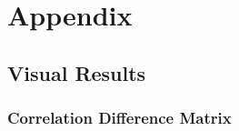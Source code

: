 
\chapter{Appendix} \label{ch:Appendix}


\section*{Visual Results}
\subsection[]{Correlation Difference Matrix}
\label{A:corr_matrix}

